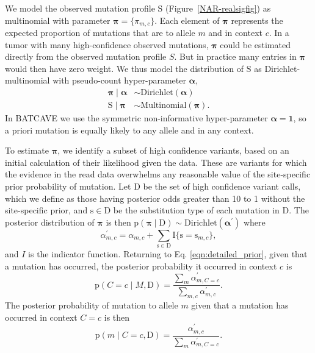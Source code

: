 \documentclass[a4,center,fleqn]{NAR}
\newcommand{\batcave}{BATCAVE\xspace}
\begin{document}
We model the observed mutation profile $\mathrm{S}$ (Figure~\ref{NAR-realsigfig}) as multinomial with parameter $\boldsymbol{\pi} = \{\pi_{m,c}\}$.
Each element of $\boldsymbol{\pi}$ represents the expected proportion of mutations that are to allele $m$ and in context $c$.
In a tumor with many high-confidence observed mutations, $\boldsymbol{\pi}$ could be estimated directly from the observed mutation profile $S$.
But in practice many entries in $\boldsymbol{\pi}$ would then have zero weight.
We thus model the distribution of $\mathrm{S}$ as Dirichlet-multinomial with pseudo-count hyper-parameter $\boldsymbol{\alpha}$, 
\begin{equation}
\begin{aligned}
  \boldsymbol{\pi} \mid \boldsymbol{\alpha} &\sim \textrm{Dirichlet}(\boldsymbol{\alpha}) \\
  \mathrm{S} \mid \boldsymbol{\pi} & \sim \textrm{Multinomial}(\boldsymbol{\pi}).
\end{aligned}
\end{equation}
In \batcave we use the symmetric non-informative hyper-parameter $\boldsymbol{\alpha} = \boldsymbol{1}$, so a priori mutation is equally likely to any allele and in any context.

To estimate $\boldsymbol{\pi}$, we identify a subset of high confidence variants, based on an initial calculation of their likelihood given the data.
These are variants for which the evidence in the read data overwhelms any reasonable value of the site-specific prior probability of mutation.
Let $\mathrm{D}$ be the set of high confidence variant calls, which we define as those having posterior odds greater than 10 to 1 without the site-specific prior, and $\mathrm{s} \in \mathrm{D}$ be the substitution type of each mutation in $\mathrm{D}$.
The posterior distribution of $\boldsymbol{\pi}$ is then $\mathrm{p}(\boldsymbol{\pi} \mid \mathrm{D}) \sim \textrm{Dirichlet}(\boldsymbol{\alpha^{\prime}})$ where
\begin{equation}
    \alpha^{\prime}_{m,c} = \alpha_{m,c} + \sum\limits_{\mathrm{s} \in \mathrm{D}} \mathrm{I}\{\mathrm{s} = \mathrm{s}_{m,c}\},
\end{equation}
and $I$ is the indicator function.
Returning to Eq. \ref{eqn:detailed_prior}, given that a mutation has occurred, the posterior probability it occurred in context $c$ is
\begin{equation}
  \label{eqn:post_pred}
  \mathrm{p}(C = c \mid M,\mathrm{D}) = \frac{\sum_{m}\alpha^{\prime}_{m,C = c}}{\sum_{m,c}\alpha^{\prime}_{m,c}}.
\end{equation}
The posterior probability of mutation to allele $m$ given that a mutation has occurred in context $C = c$ is then
\begin{equation}
  \label{eqn:to_allele}
   \mathrm{p}(m \mid C = c,\mathrm{D}) = \frac{\alpha^{\prime}_{m,c}}{\sum_{m} \alpha^{\prime}_{m,C = c}}.
\end{equation}
\end{document}
